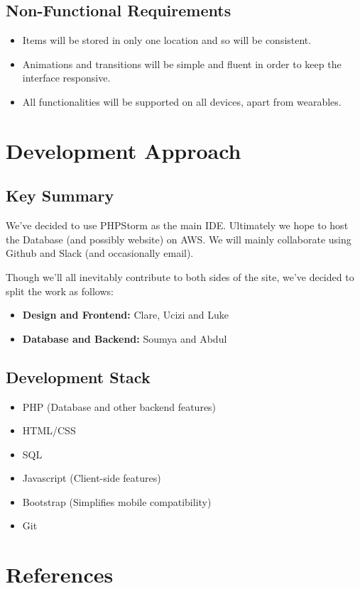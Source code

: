 \documentclass[12pt]{article}
\begin{document}
\label{fr:watchlist}

\label{fr:user-score}

\label{fr:user-ratings}


\subsection{Non-Functional Requirements}
\begin{itemize}
    \item Items will be stored in only one location and so will be consistent.
    \item Animations and transitions will be simple and fluent in order to keep
        the interface responsive.
    \item All functionalities will be supported on all devices, apart from
        wearables.
\end{itemize}


\section{Development Approach}

\subsection{Key Summary}
We've decided to use PHPStorm as the main IDE. Ultimately we hope to host the
Database (and possibly website) on AWS. We will mainly collaborate using
Github and Slack (and occasionally email).

Though we'll all inevitably contribute to both sides of the site, we've
decided to split the work as follows:
\begin{itemize}
    \item \textbf{Design and Frontend:} Clare, Ucizi and Luke
    \item \textbf{Database and Backend:} Soumya and Abdul
\end{itemize}

\subsection{Development Stack}
\begin{itemize}
    \item PHP (Database and other backend features)
    \item HTML/CSS
    \item SQL
    \item Javascript (Client-side features)
    \item Bootstrap (Simplifies mobile compatibility)
    \item Git
\end{itemize}


\section{References}
\end{document}
